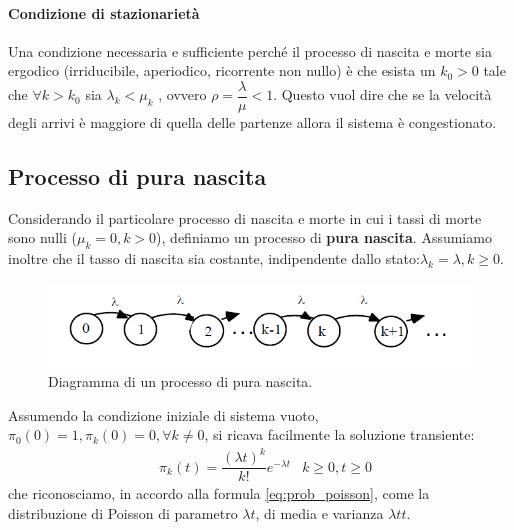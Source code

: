 \paragraph{Condizione di stazionarietà}
Una condizione necessaria e sufficiente perché il processo di nascita e morte sia
ergodico (irriducibile, aperiodico, ricorrente non nullo)  è che esista un $k_0>0$
tale che $\forall k > k_0 $ sia $\lambda_k < \mu_k$ , ovvero $\rho = \dfrac{\lambda}{\mu} < 1 $. Questo vuol dire che se la velocità degli arrivi è maggiore di quella delle partenze allora il sistema è congestionato.

\subsection{Processo di pura nascita}
Considerando il particolare processo di nascita e morte in cui i tassi di morte sono
nulli ($\mu_k=0, k>0$), definiamo un processo di \textbf{pura nascita}. Assumiamo inoltre che il
tasso di nascita sia costante, indipendente dallo stato:$\lambda_k = \lambda, k \geq 0$.

\begin{figure}[H]
	\centering
    \includegraphics[width=15cm, keepaspectratio]{img/processo_pura_nascita.png}
	\caption{Diagramma di un processo di pura nascita.}\label{fig:diagr_pura_nascita}
\end{figure}

Assumendo la condizione iniziale di sistema vuoto, $\pi_0(0) = 1, \pi_k(0) = 0, \forall k\neq 0$, si ricava facilmente la soluzione transiente:
\begin{align}
    & \pi_k(t)= \dfrac{(\lambda t)^k}{k!} e^{-\lambda t} & k\geq 0, t\geq 0
\end{align}
che riconosciamo, in accordo alla formula \ref{eq:prob_poisson}, come la distribuzione di Poisson di
parametro $\lambda t$, di media e varianza $\lambda tt$.

